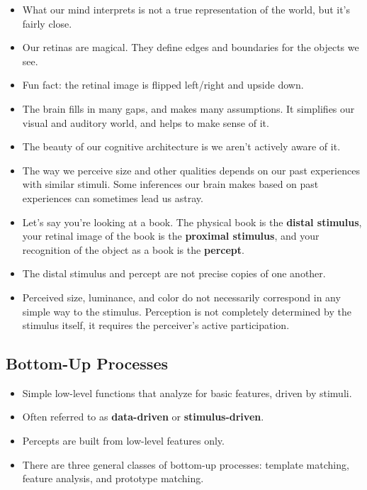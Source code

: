 \documentclass[]{article}
\begin{document}
		\begin{itemize}
			\item What our mind interprets is not a true representation of the world, but it's fairly close.
			\item Our retinas are magical. They define edges and boundaries for the objects we see.
			\item Fun fact: the retinal image is flipped left/right and upside down.
			\item The brain fills in many gaps, and makes many assumptions. It simplifies our visual and auditory world, and helps to make sense of it.
			\item The beauty of our cognitive architecture is we aren't actively aware of it.
			\item The way we perceive size and other qualities depends on our past experiences with similar stimuli. Some inferences our brain makes based on past experiences can sometimes lead us astray.
			\item Let's say you're looking at a book. The physical book is the \textbf{distal stimulus}, your retinal image of the book is the \textbf{proximal stimulus}, and your recognition of the object as a book is the \textbf{percept}.
			\item The distal stimulus and percept are not precise copies of one another.
			\item Perceived size, luminance, and color do not necessarily correspond in any simple way to the stimulus. Perception is not completely determined by the stimulus itself, it requires the perceiver's active participation.
		\end{itemize}

		\subsection{Bottom-Up Processes}
			\begin{itemize}
				\item Simple low-level functions that analyze for basic features, driven by stimuli.
				\item Often referred to as \textbf{data-driven} or \textbf{stimulus-driven}.
				\item Percepts are built from low-level features only.
				\item There are three general classes of bottom-up processes: template matching, feature analysis, and prototype matching.
			\end{itemize}
\end{document}
